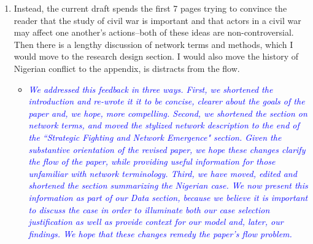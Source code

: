 \begin{enumerate}
\item Instead, the current draft spends the first 7 pages trying to convince the reader that the study of civil war is important and that actors in a civil war may affect one another's actions--both of these ideas are non-controversial. Then there is a lengthy discussion of network terms and methods, which I would move to the research design section.  I would also move the history of Nigerian conflict to the appendix, is distracts from the flow.	
	\begin{itemize}
		\item \textcolor{blue}{ \emph{
		We addressed this feedback in three ways. First, we shortened the introduction and re-wrote it it to be concise, clearer about the goals of the paper and, we hope, more compelling. Second, we shortened the section on network terms, and moved the stylized network description to the end of  the ``Strategic Fighting and Network Emergence" section.  Given the substantive orientation of the revised paper, we hope these changes clarify the flow of the paper, while providing useful information for those unfamiliar with network terminology. Third, we have moved, edited and shortened the section summarizing the Nigerian case. We now present this information as part of our Data section, because we believe it is important to discuss the case in order to illuminate both our case selection justification as well as provide context for our model and, later, our findings. We hope that these changes remedy the paper's flow problem.
		}}
	\end{itemize}		
\end{enumerate}
